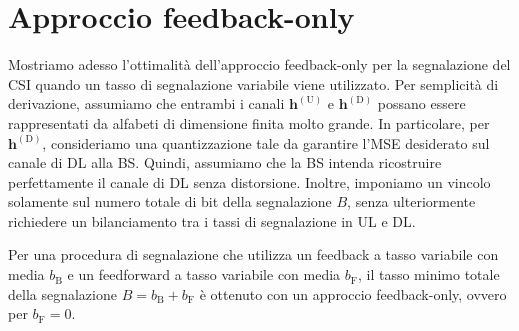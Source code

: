 \section{Approccio feedback-only}

Mostriamo adesso l'ottimalità dell'approccio feedback-only per la
segnalazione del CSI quando un tasso di segnalazione variabile viene
utilizzato. Per semplicità di derivazione, assumiamo che entrambi i canali
\(\bm{h}^\mathrm{(U)}\) e \(\bm{h}^\mathrm{(D)}\) possano essere rappresentati
da alfabeti di dimensione finita molto grande. In particolare, per
\(\bm{h}^\mathrm{(D)}\), consideriamo una quantizzazione tale da garantire
l'MSE desiderato sul canale di DL alla BS. Quindi, assumiamo che la BS intenda
ricostruire perfettamente il canale di DL senza distorsione. Inoltre, imponiamo
un vincolo solamente sul numero totale di bit della segnalazione \(B\), senza
ulteriormente richiedere un bilanciamento tra i tassi di segnalazione in UL e
DL.

\begin{thm}
    \label{thm:feedback-only}

    Per una procedura di segnalazione che utilizza un feedback a tasso
    variabile con media \(b_\mathrm{B}\) e un feedforward a tasso variabile con
    media \(b_\mathrm{F}\), il tasso minimo totale della segnalazione \(B =
    b_\mathrm{B} + b_\mathrm{F}\) è ottenuto con un approccio feedback-only,
    ovvero per \(b_\mathrm{F} = 0\).
\end{thm}

